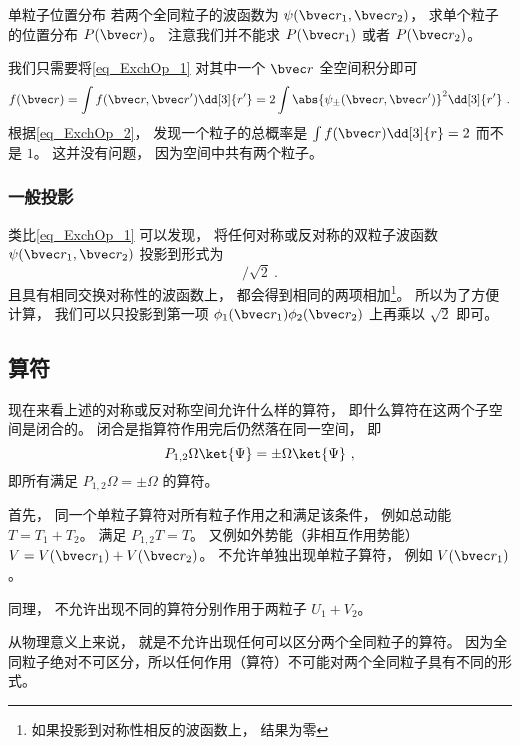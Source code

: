 \begin{example}{单粒子位置分布}\label{ex_ExchOp_1}
若两个全同粒子的波函数为 $\psi(\bvec r_1,\bvec r_2)$， 求单个粒子的位置分布 $P(\bvec r)$。 注意我们并不能求 $P(\bvec r_1)$ 或者 $P(\bvec r_2)$。

我们只需要将\autoref{eq_ExchOp_1} 对其中一个 $\bvec r$ 全空间积分即可
\begin{equation}
f(\bvec r) = \int f(\bvec r, \bvec r') \dd[3]{r'} = 2\int \abs{\psi_\pm(\bvec r, \bvec r')}^2 \dd[3]{r'} ~.
\end{equation}
根据\autoref{eq_ExchOp_2}， 发现一个粒子的总概率是 $\int f(\bvec r) \dd[3]{r} = 2$ 而不是 $1$。 这并没有问题， 因为空间中共有两个粒子。
\end{example}

\subsubsection{一般投影}
类比\autoref{eq_ExchOp_1} 可以发现， 将任何对称或反对称的双粒子波函数 $\psi(\bvec r_1, \bvec r_2)$ 投影到形式为
\begin{equation}
[\phi_1(\bvec r_1)\phi_2(\bvec r_2) \pm \phi_2(\bvec r_1)\phi_1(\bvec r_2)]/\sqrt{2}~.
\end{equation}
且具有相同交换对称性的波函数上， 都会得到相同的两项相加\footnote{如果投影到对称性相反的波函数上， 结果为零}。 所以为了方便计算， 我们可以只投影到第一项 $\phi_1(\bvec r_1)\phi_2(\bvec r_2)$ 上再乘以 $\sqrt{2}$ 即可。

\subsection{算符}
现在来看上述的对称或反对称空间允许什么样的算符， 即什么算符在这两个子空间是闭合的。 闭合是指算符作用完后仍然落在同一空间， 即
\begin{equation}
P_{1,2}\Omega\ket{\Psi} = \pm \Omega \ket{\Psi}~,
\end{equation}
即所有满足 $P_{1,2}\Omega = \pm \Omega$ 的算符。

首先， 同一个单粒子算符对所有粒子作用之和满足该条件， 例如总动能 $T = T_1 + T_2$。 满足 $P_{1,2}T = T$。 又例如外势能（非相互作用势能） $V = V(\bvec r_1) + V(\bvec r_2)$。 不允许单独出现单粒子算符， 例如 $V(\bvec r_1)$。

同理， 不允许出现不同的算符分别作用于两粒子 $U_1 + V_2$。

从物理意义上来说， 就是不允许出现任何可以区分两个全同粒子的算符。 因为全同粒子绝对不可区分，所以任何作用（算符）不可能对两个全同粒子具有不同的形式。

